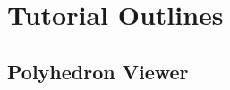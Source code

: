 \documentclass[twocolumn]{article}
\begin{document}



      


\section*{Tutorial Outlines}

\subsection*{Polyhedron Viewer}
\end{document}
